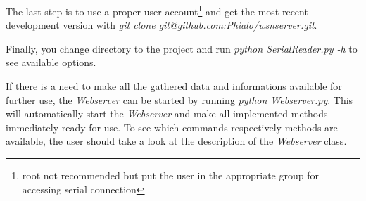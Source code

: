 The last step is to use a proper user-account\footnote{root not recommended but put the user in the appropriate group for accessing serial connection} and
get the most recent development version with \textit{git clone git@github.com:Phialo/wsnserver.git}.

Finally, you change directory to the project and run \textit{python SerialReader.py -h} to see available options.

If there is a need to make all the gathered data and informations available for further use, the \textit{Webserver} can be started by running \textit{python Webserver.py}. This will automatically start the 
\textit{Webserver} and make all implemented methods immediately ready for use. To see which commands respectively methods are available, the user should take a look at the description of the \textit{Webserver} class.